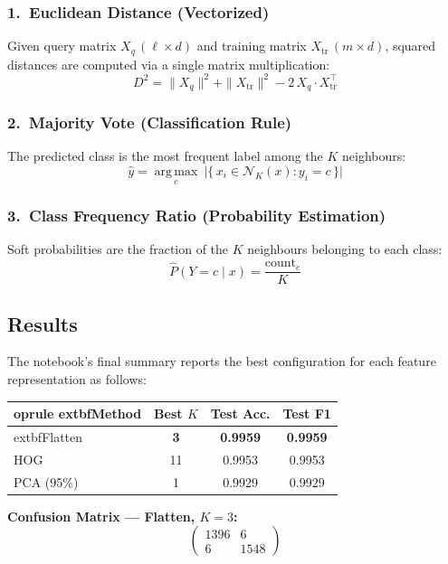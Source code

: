 \documentclass[11pt,a4paper]{article}
\begin{document}
\subsubsection*{1.\ Euclidean Distance (Vectorized)}
Given query matrix $X_q\,(\ell \times d)$ and training matrix $X_{\text{tr}}\,(m \times d)$, squared distances are computed via a single matrix multiplication:
\[
D^2 = \|X_q\|^2 + \|X_{\text{tr}}\|^2 - 2\,X_q \cdot X_{\text{tr}}^\top
\]

\subsubsection*{2.\ Majority Vote (Classification Rule)}
The predicted class is the most frequent label among the $K$ neighbours:
\[
\hat{y} = \operatorname*{arg\,max}_{c}\ \bigl|\{\,x_i \in \mathcal{N}_K(x) : y_i = c\,\}\bigr|
\]

\subsubsection*{3.\ Class Frequency Ratio (Probability Estimation)}
Soft probabilities are the fraction of the $K$ neighbours belonging to each class:
\[
\hat{P}(Y = c \mid x) = \frac{\text{count}_c}{K}
\]

\subsection{Results}

The notebook's final summary reports the best configuration for each feature representation as follows:

\vspace{4pt}
\begin{center}
\begin{tabular}{lccc}
    oprule
    extbf{Method} & \textbf{Best $K$} & \textbf{Test Acc.} & \textbf{Test F1} \\
\midrule
    extbf{Flatten} & \textbf{3} & \textbf{0.9959} & \textbf{0.9959} \\
HOG              & 11         & 0.9953          & 0.9953          \\
PCA (95\%)       & 1          & 0.9929          & 0.9929          \\
\bottomrule
\end{tabular}
\end{center}
\vspace{4pt}

\noindent\textbf{Confusion Matrix --- Flatten, $K=3$:}
\[
\begin{pmatrix} 1396 & 6 \\ 6 & 1548 \end{pmatrix}
\]
\end{document}
